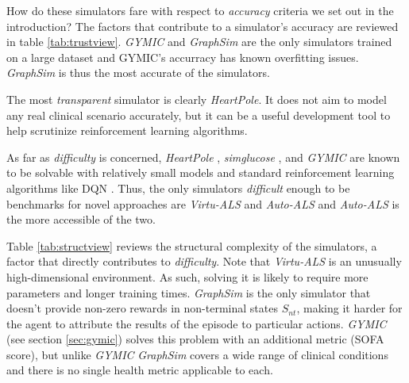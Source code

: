 How do these simulators fare with respect to \emph{accuracy} criteria we set out in the introduction? 
The factors that contribute to a simulator's accuracy are reviewed in table \ref{tab:trustview}.
\emph{GYMIC} and \emph{GraphSim} are the only simulators trained on a large dataset and GYMIC's accurracy has known overfitting issues.
\emph{GraphSim} is thus the most accurate of the simulators.

The most \emph{transparent} simulator is clearly \emph{HeartPole}.
It does not aim to model any real clinical scenario accurately, but it can be a useful development tool to help scrutinize reinforcement learning algorithms.

As far as \emph{difficulty} is concerned, \emph{HeartPole} \cite{heartpole}, \emph{simglucose} \cite{simglucose-baseline}, and \emph{GYMIC} \cite{gymic} are known to be solvable with relatively small models and standard reinforcement learning algorithms like DQN \cite{dqn}. 
Thus, the only simulators \emph{difficult} enough to be benchmarks for novel approaches are \emph{Virtu-ALS} and \emph{Auto-ALS} and \emph{Auto-ALS} is the more accessible of the two.

Table \ref{tab:structview} reviews the structural complexity of the simulators, a factor that directly contributes to \emph{difficulty}.
Note that \emph{Virtu-ALS} is an unusually high-dimensional environment.
As such, solving it is likely to require more parameters and longer training times.
\emph{GraphSim} is the only simulator that doesn't provide non-zero rewards in non-terminal states $S_{nt}$, making it harder for the agent to attribute the results of the episode to particular actions.
\emph{GYMIC} (see section \ref{sec:gymic}) solves this problem with an additional metric (SOFA score), but unlike \emph{GYMIC} \emph{GraphSim} covers a wide range of clinical conditions and there is no single health metric applicable to each.